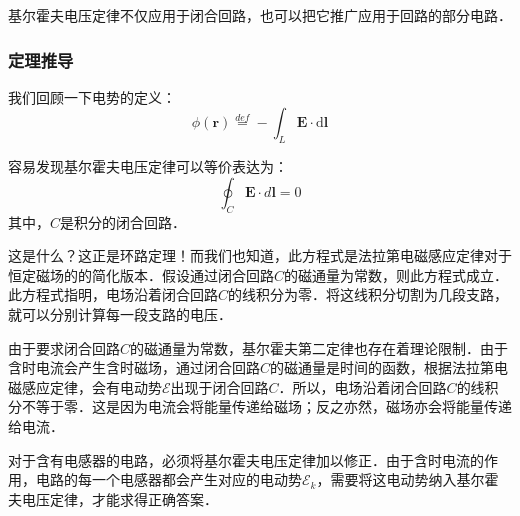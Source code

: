 基尔霍夫电压定律不仅应用于闭合回路，也可以把它推广应用于回路的部分电路．

\subsubsection{定理推导}
我们回顾一下电势的定义：
\begin{equation}
\phi(\mathbf{r})\stackrel{def}{=} - \int_{L} \mathbf{E} \cdot \mathrm{d} \mathbf{l}
\end{equation}

容易发现基尔霍夫电压定律可以等价表达为：
\begin{equation}
\oint _{{C} }\mathbf {E} \cdot d\mathbf {l} =0
\end{equation}
其中，${C}$是积分的闭合回路．

这是什么？这正是环路定理！而我们也知道，此方程式是法拉第电磁感应定律对于恒定磁场的的简化版本．假设通过闭合回路${C}$的磁通量为常数，则此方程式成立．此方程式指明，电场沿着闭合回路${C}$的线积分为零．将这线积分切割为几段支路，就可以分别计算每一段支路的电压．

由于要求闭合回路${C}$的磁通量为常数，基尔霍夫第二定律也存在着理论限制．由于含时电流会产生含时磁场，通过闭合回路${C}$的磁通量是时间的函数，根据法拉第电磁感应定律，会有电动势$\mathcal{E}$出现于闭合回路${C}$．所以，电场沿着闭合回路${C}$的线积分不等于零．这是因为电流会将能量传递给磁场；反之亦然，磁场亦会将能量传递给电流．

对于含有电感器的电路，必须将基尔霍夫电压定律加以修正．由于含时电流的作用，电路的每一个电感器都会产生对应的电动势$\mathcal{E}_k$，需要将这电动势纳入基尔霍夫电压定律，才能求得正确答案．
